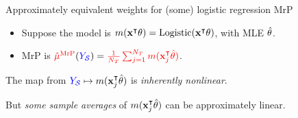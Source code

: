 \begin{frame}[t]{Approximately equivalent weights for (some) logistic regression MrP}

\def\alphav{\mathbf{\alpha}}
%
\begin{itemize}
    \item Suppose the model is $m(\mathbf{x}^\intercal \theta) = \mathrm{Logistic}(\mathbf{x}^\intercal \theta)$, with MLE $\hat{\theta}$.
    \item MrP is $\textcolor{red}{\hat{\mu}^{\mathrm{MrP}}}(\textcolor{blue}{\textcolor{blue}{Y_{\mathcal{S}}}}) = \textcolor{red}{\frac{1}{{\textcolor{red}{N_T}}} \sum_{j=1}^{\textcolor{red}{N_T}} m(\mathbf{x}_j^\intercal \hat{\theta})}$.
\end{itemize}

\pause
The map from $\textcolor{blue}{\textcolor{blue}{Y_{\mathcal{S}}}} \mapsto m(\mathbf{x}_j^\intercal \hat{\theta})$ is
\emph{inherently nonlinear}.

But \emph{some sample averages}
of $m(\mathbf{x}_j^\intercal \hat{\theta})$ can be approximately linear.

\end{frame}





